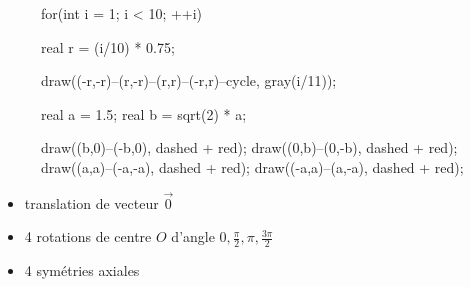\begin{itemize}
\begin{figure}[H]
\begin{asy}
				for(int i = 1; i < 10; ++i) {
					real r = (i/10) * 0.75;

					draw((-r,-r)--(r,-r)--(r,r)--(-r,r)--cycle, gray(i/11));
				}

				real a = 1.5;
				real b = sqrt(2) * a;

				draw((b,0)--(-b,0), dashed + red);
				draw((0,b)--(0,-b), dashed + red);
				draw((a,a)--(-a,-a), dashed + red);
				draw((-a,a)--(a,-a), dashed + red);
			\end{asy}
		\end{figure}
		\begin{itemize}
			\item translation de vecteur  $\vec{0}$
			\item 4 rotations de centre $O$ d'angle $0, \frac{\pi}{2}, \pi, \frac{3\pi}{2}$
			\item 4 symétries axiales
		\end{itemize}
\end{itemize}

\vspace{2mm}

